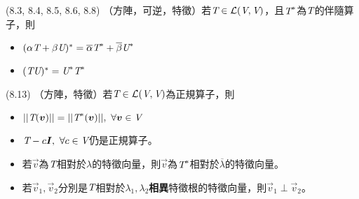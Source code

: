 \item \begin{theorem}{(8.3, 8.4, 8.5, 8.6, 8.8)} （方陣，可逆，特徵）若$\textit{T} \in \mathcal{L}(\textit{V}, \textit{V})$，且$\textit{T}^*$為$\textit{T}$的伴隨算子，則
	\begin{itemize}
		\item $(\alpha\textit{T} + \beta\textit{U})^* = \overline{\alpha}\textit{T}^* + \overline{\beta}\textit{U}^*$
		\item $(\textit{T}\textit{U})^* = \textit{U}^*\textit{T}^*$
	\end{itemize}
\end{theorem}

\item \begin{theorem}{(8.13)} （方陣，特徵）若$\textit{T} \in \mathcal{L}(\textit{V}, \textit{V})$為正規算子，則
	\begin{itemize}
		\item $||\T(\vec{v})|| = ||\T^*(\vec{v})||, \ \forall \vec{v} \in \V$
		\item $\textit{T} - c\boldsymbol{I}, \ \forall c \in \textit{V}$仍是正規算子。
		\item 若$\vec{v}$為$\textit{T}$相對於$\lambda$的特徵向量，則$\vec{v}$為$\textit{T}^*$相對於$\overline{\lambda}$的特徵向量。
		\item 若$\vec{v}_1, \vec{v}_2$分別是$\textit{T}$相對於$\lambda_1, \lambda_2$\textbf{相異}特徵根的特徵向量，則$\vec{v}_1 \perp \vec{v}_2$。
	\end{itemize}
\end{theorem}


